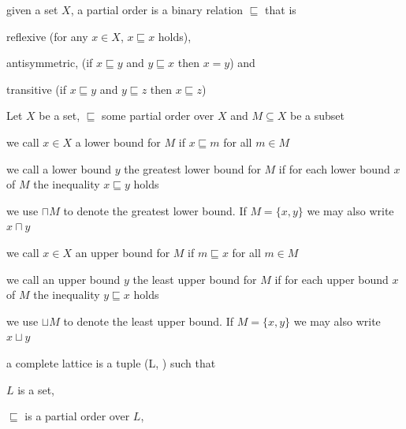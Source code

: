 \documentclass[landscape, a4paper]{article}
\begin{document}
\begin{minipage}[t]{0.2\linewidth}
	\begin{betterlist}
		\item given a set $X$, a partial order is a binary relation $\sqsubseteq$ that is
		\begin{betterlist}
			\item reflexive (for any $x \in X$, $x \sqsubseteq x$ holds),
			\item antisymmetric, (if $x \sqsubseteq y$ and $y \sqsubseteq x$ then $x = y$) and
			\item transitive (if $x \sqsubseteq y$ and $y \sqsubseteq z$ then $x \sqsubseteq z$)
			\item {}
		\end{betterlist}
		\item Let $X$ be a set, $\sqsubseteq$ some partial order over $X$ and $M \subseteq X$ be a subset
		\begin{betterlist}
			\item we call $x \in X$ a \alert{lower bound} for $M$ if $x \sqsubseteq m$ for all $m \in M$
			\item we call a lower bound $y$ the \alert{greatest lower bound} for $M$ if for each lower bound $x$ of $M$ the inequality $x \sqsubseteq y$ holds
			\begin{betterlist}
				\item we use $\sqcap M$ to denote the \alert{greatest lower bound}. If $M = \{x, y\}$ we may also write $x \sqcap y$
			\end{betterlist}
			\item we call $x \in X$ an \alert{upper bound} for $M$ if $m \sqsubseteq x$ for all $m \in M$
			\item we call an upper bound $y$ the \alert{least upper bound} for $M$ if for each upper bound $x$ of $M$ the inequality $y \sqsubseteq x$ holds
			\begin{betterlist}
				\item we use $\sqcup M$ to denote the \alert{least upper bound}. If $M = \{x, y\}$ we may also write $x \sqcup y$
			\end{betterlist}
		\end{betterlist}
		\item a \alert{complete lattice} is a tuple (L, \sqsubseteq ) such that
		\begin{betterlist}
			\item $L$ is a set,
			\item $\sqsubseteq $ is a \alert{partial order} over $L$,

\end{betterlist}
\end{betterlist}
\end{minipage}
\end{document}
